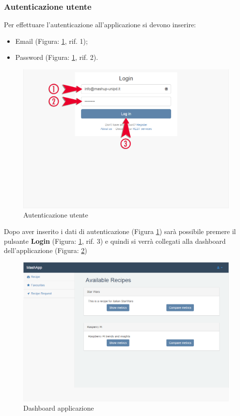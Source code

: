 		\pagebreak
		\subsubsection{Autenticazione utente} %
		\label{sec:autenticazione_utente}
			Per effettuare l'autenticazione\gloss{} all'applicazione si devono inserire:
			\begin{itemize}
				\item Email (Figura: \ref{fig:autenticazione_utente}, rif. 1);
				\item Password (Figura: \ref{fig:autenticazione_utente}, rif. 2).
			\end{itemize}
			\begin{figure}[H]
				\centering
				\centerline{\includegraphics[width=14cm]{images/autenticazione_utente.png}}
				\caption{Autenticazione utente}
				\label{fig:autenticazione_utente}
			\end{figure}
			Dopo aver inserito i dati di autenticazione (Figura \ref{fig:autenticazione_utente}) sarà possibile premere il pulsante \textbf{Login}\gloss{} (Figura: \ref{fig:autenticazione_utente}, rif. 3) e quindi si verrà collegati alla dashboard\gloss{} dell'applicazione (Figura: \ref{fig:dashboard})
			\begin{figure}[H]
				\centering
				\centerline{\includegraphics[width=19cm]{images/dashboard.png}}
				\caption{Dashboard applicazione}
				\label{fig:dashboard}
			\end{figure}



